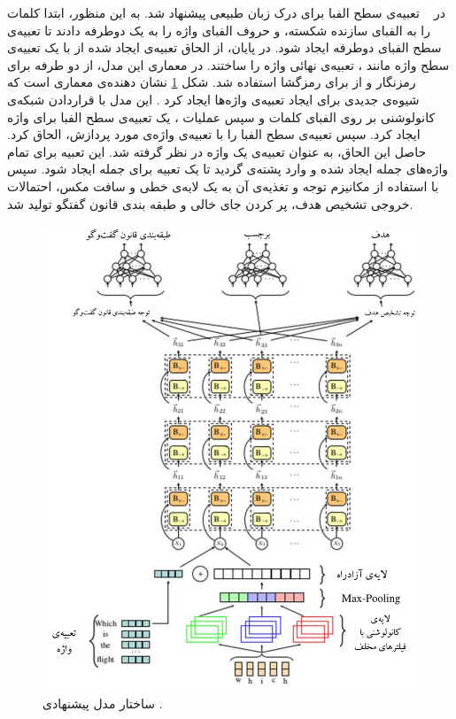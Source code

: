 در \ \cite{Firdaus:2021} تعبیه‌ی سطح الفبا برای درک زبان طبیعی پیشنهاد شد. به این منظور، ابتدا کلمات را به الفبای سازنده شکسته، و حروف الفبای واژه را به یک  دوطرفه دادند تا تعبیه‌ی سطح الفبای دوطرفه ایجاد شود. در پایان، از الحاق تعبیه‌ی ایجاد شده از  با یک تعبیه‌ی سطح واژه مانند ، تعبیه‌ی نهائی واژه را ساختند. در معماری این مدل، از  دو طرفه برای رمزنگار و از  برای رمزگشا استفاده شد.
شکل \ref{Fig:firdaus} نشان دهنده‌ی معماری  است که شیوه‌ی جدیدی برای ایجاد تعبیه‌ی واژه‌ها ایجاد کرد \cite{Firdaus:2021}. این مدل با قراردادن شبکه‌ی کانولوشنی بر روی الفبای کلمات و سپس عملیات ، یک تعبیه‌ی سطح الفبا برای واژه ایجاد کرد. سپس تعبیه‌ی سطح الفبا را با تعبیه‌ی واژه‌ی مورد پردازش، الحاق کرد. حاصل این الحاق، به عنوان تعبیه‌ی یک واژه در نظر گرفته شد. این تعبیه برای تمام واژه‌های جمله ایجاد شده و وارد پشته‌ی  گردید تا یک تعبیه برای جمله ایجاد شود. سپس با استفاده از مکانیزم توجه \cite{attention_bahdanau} و تغذیه‌ی آن به یک لایه‌ی خطی و سافت مکس، احتمالات خروجی تشخیص هدف، پر کردن جای خالی و طبقه بندی قانون گفتگو تولید شد.
\begin{figure}[!htb]
	\centering
	\includegraphics[scale=0.6]{Figures/firdaus2021.pdf}
	\caption[ساختار مدل پیشنهادی ]{ساختار مدل پیشنهادی  \cite{Firdaus:2021}.}
	\label{Fig:firdaus}
\end{figure}


